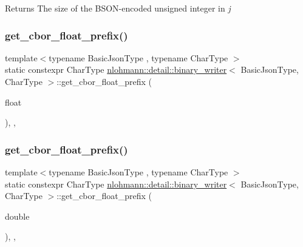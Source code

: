 \begin{DoxyReturn}{Returns}
The size of the B\+S\+O\+N-\/encoded unsigned integer in {\itshape j} 
\end{DoxyReturn}
\mbox{\label{classnlohmann_1_1detail_1_1binary__writer_a2b5cb010077da6241a18bb334736464c}} 
\subsubsection{\texorpdfstring{get\+\_\+cbor\+\_\+float\+\_\+prefix()}{get\_cbor\_float\_prefix()}\hspace{0.1cm}{\footnotesize\ttfamily [1/2]}}
{\footnotesize\ttfamily template$<$typename Basic\+Json\+Type , typename Char\+Type $>$ \\
static constexpr Char\+Type \hyperlink{classnlohmann_1_1detail_1_1binary__writer}{nlohmann\+::detail\+::binary\+\_\+writer}$<$ Basic\+Json\+Type, Char\+Type $>$\+::get\+\_\+cbor\+\_\+float\+\_\+prefix (\begin{DoxyParamCaption}\item[{float}]{ }\end{DoxyParamCaption})\hspace{0.3cm}{\ttfamily [inline]}, {\ttfamily [static]}, {\ttfamily [private]}}

\mbox{\label{classnlohmann_1_1detail_1_1binary__writer_afe5ac43e05973ba09ee79227bb589b59}} 
\subsubsection{\texorpdfstring{get\+\_\+cbor\+\_\+float\+\_\+prefix()}{get\_cbor\_float\_prefix()}\hspace{0.1cm}{\footnotesize\ttfamily [2/2]}}
{\footnotesize\ttfamily template$<$typename Basic\+Json\+Type , typename Char\+Type $>$ \\
static constexpr Char\+Type \hyperlink{classnlohmann_1_1detail_1_1binary__writer}{nlohmann\+::detail\+::binary\+\_\+writer}$<$ Basic\+Json\+Type, Char\+Type $>$\+::get\+\_\+cbor\+\_\+float\+\_\+prefix (\begin{DoxyParamCaption}\item[{double}]{ }\end{DoxyParamCaption})\hspace{0.3cm}{\ttfamily [inline]}, {\ttfamily [static]}, {\ttfamily [private]}}

